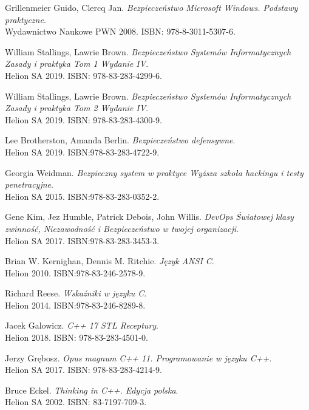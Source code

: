\begin{thebibliography}{9}
Grillenmeier Guido, Clercq Jan. 
\textit{Bezpieczeństwo Microsoft Windows. Podstawy praktyczne}. 
\\Wydawnictwo Naukowe PWN 2008. ISBN: 978-8-3011-5307-6.


William Stallings, Lawrie Brown. 
\textit{Bezpieczeństwo Systemów Informatycznych Zasady i praktyka Tom 1 Wydanie IV}. 
\\Helion SA 2019. ISBN: 978-83-283-4299-6.


William Stallings, Lawrie Brown. 
\textit{Bezpieczeństwo Systemów Informatycznych Zasady i praktyka Tom 2 Wydanie IV}. 
\\ Helion SA 2019. ISBN: 978-83-283-4300-9.

Lee Brotherston, Amanda Berlin. 
\textit{Bezpieczeństwo defensywne}. 
\\Helion SA 2019. ISBN:978-83-283-4722-9.

Georgia Weidman. 
\textit{Bezpieczny system w praktyce Wyższa szkoła hackingu i testy penetracyjne}. 
\\ Helion SA 2015. ISBN:978-83-283-0352-2.

Gene Kim, Jez Humble, Patrick Debois, John Willis.
\textit{DevOps Światowej klasy zwinność, Niezawodność i Bezpieczeństwo w twojej organizacji}. 
\\ Helion SA 2017. ISBN:978-83-283-3453-3.






Brian W. Kernighan, Dennis M. Ritchie.
\textit{Język ANSI C}. 
\\ Helion 2010. ISBN:978-83-246-2578-9.


Richard Reese.
\textit{Wskaźniki w języku C}. 
\\Helion 2014. ISBN:978-83-246-8289-8.


Jacek Galowicz.
\textit{C++ 17 STL Receptury}. 
\\ Helion 2018. ISBN: 978-83-283-4501-0.


Jerzy Grębosz.
\textit{Opus magnum C++ 11. Programowanie w języku C++}. 
\\ Helion SA 2017. ISBN: 978-83-283-4214-9.

Bruce Eckel.
\textit{Thinking in C++. Edycja polska}. 
\\ Helion SA 2002. ISBN: 83-7197-709-3.



\end{thebibliography}
